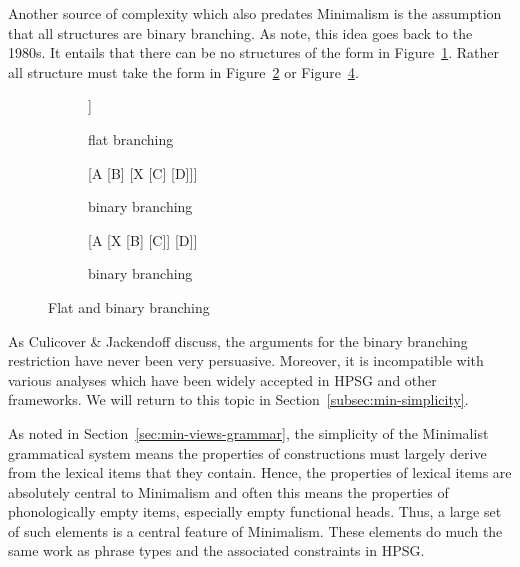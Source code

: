 \documentclass[output=paper]{langsci/langscibook}
\begin{document}
Another source of complexity which also predates Minimalism is the assumption that
all structures are binary branching. As  \citet[112--116]{CJ2005a} note, this idea goes back to the
1980s. It entails that there can be no structures of the form in
Figure~\ref{fig:min-trinary}. Rather all structure must take the form in
Figure~\ref{fig:min-binary-a} or Figure~\ref{fig:min-binary-b}.
\begin{figure}
\hfill
\begin{subfigure}[t]{0.3\textwidth}
\centering
	\begin{forest} %
		[A
		[B][C][D]]
	\end{forest}
\vfill
	\caption{\label{fig:min-trinary}flat branching}
\end{subfigure}
\hfill
\begin{subfigure}[t]{0.3\textwidth}
\centering
	\begin{forest} %
		[A
		  [B]
		  [X 
                    [C] 
                    [D]]]
	\end{forest}
	\caption{\label{fig:min-binary-a}binary branching}
\end{subfigure}
\hfill
\begin{subfigure}[t]{0.3\textwidth}
\centering
	\begin{forest} %
		[A
		  [X 
                    [B]
                    [C]]
		  [D]]
	\end{forest}
	\caption{\label{fig:min-binary-b}binary branching}
\end{subfigure}
\hfill\mbox{}
\caption{Flat and binary branching}
\end{figure}
%
As Culicover \& Jackendoff discuss, the arguments for the binary branching restriction have never
been very persuasive. Moreover, it is incompatible with various analyses which have been widely
accepted in HPSG and other frameworks. We will return to this topic in
Section~\ref{subsec:min-simplicity}. 

As noted in Section~\ref{sec:min-views-grammar}, the simplicity of the Minimalist grammatical system
means the properties of constructions must largely derive from the lexical items that they
contain. Hence, the properties of lexical items are absolutely central to Minimalism and often this
means the properties of phonologically empty items, especially empty functional heads. Thus, a large
set of such elements is a central feature of Minimalism. These elements do much the same work as
phrase types and the associated constraints in HPSG. 
\end{document}
